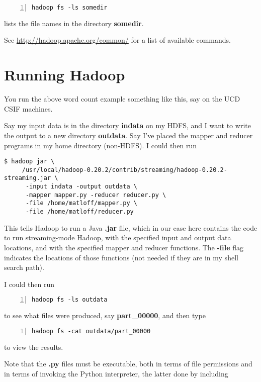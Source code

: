 \begin{lstlisting}[numbers=left]
hadoop fs -ls somedir
\end{lstlisting}

lists the file names in the directory {\bf somedir}. 

See \url{http://hadoop.apache.org/common/} for a list of available
commands.

\section{Running Hadoop}

You run the above word count example something like this, say on the UCD
CSIF machines.  

Say my input data is in the directory {\bf indata} on my HDFS, and I
want to write the output to a new directory {\bf outdata}.   Say I've
placed the mapper and reducer programs in my home directory (non-HDFS).
I could then run

\begin{lstlisting}
$ hadoop jar \
     /usr/local/hadoop-0.20.2/contrib/streaming/hadoop-0.20.2-streaming.jar \
      -input indata -output outdata \
      -mapper mapper.py -reducer reducer.py \
      -file /home/matloff/mapper.py \
      -file /home/matloff/reducer.py
\end{lstlisting}

This tells Hadoop to run a Java {\bf .jar} file, which in our case here
contains the code to run streaming-mode Hadoop, with the specified input
and output data locations, and with the specified mapper and reducer
functions.  The {\bf -file} flag indicates the locations of those
functions (not needed if they are in my shell search path).

I could then run 

\begin{lstlisting}[numbers=left]
hadoop fs -ls outdata
\end{lstlisting}

to see what files were produced, say {\bf part\_00000}, and then type

\begin{lstlisting}[numbers=left]
hadoop fs -cat outdata/part_00000
\end{lstlisting}

to view the results.

Note that the {\bf .py} files must be executable, both in terms of file
permissions and in terms of invoking the Python interpreter, the latter
done by including 

